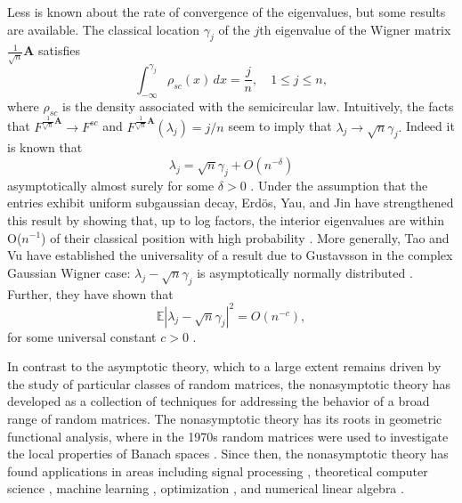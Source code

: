 \documentclass[11pt,letterpaper,twoside,reqno,nosumlimits]{amsart}
\newcommand{\mat}[1]{\ensuremath{\bm{#1}}} %
\newcommand{\E}{\ensuremath{\mathbb{E}}}
\theoremstyle{remark}
\numberwithin{equation}{section}
\numberwithin{thm}{section}
\numberwithin{prop}{section}
\numberwithin{defn}{section}
\numberwithin{remark}{section}
\begin{document}
Less is known about the rate of convergence of the eigenvalues, but some results are available. The classical location $\gamma_j$ of the $j$th eigenvalue of the Wigner matrix $\frac{1}{\sqrt{n}} \mat{A}$ satisfies
\[
\int_{-\infty}^{\gamma_j} \rho_{sc}(x) \, dx = \frac{j}{n}, \quad 1 \leq j \leq n ,
\]
where $\rho_{sc}$ is the density associated with the semicircular law. Intuitively, the facts that $F^{\frac{1}{\sqrt{n}}\mat{A}} \rightarrow F^{sc}$ and $F^{\frac{1}{\sqrt{n}}\mat{A}}(\lambda_j) = j/n$ seem to imply that $\lambda_j \rightarrow \sqrt{n}\gamma_j.$ Indeed it is known that 
\[
\lambda_j = \sqrt{n} \gamma_j + O(n^{-\delta})
\]
asymptotically almost surely for some $\delta > 0$ \cite{BY88a,BY88b}. Under the assumption that the entries exhibit uniform subgaussian decay, Erd\"os, Yau, and Jin have strengthened this result by showing that, up to log factors, the interior eigenvalues are within O($n^{-1}$) of their classical position with high probability \cite{ErdosYauYin10}. More generally, Tao and Vu have established the universality of a result due to Gustavsson \cite{Gustavsson05} in the complex Gaussian Wigner case: $\lambda_j - \sqrt{n} \gamma_j$ is asymptotically normally distributed \cite{TaoVu11}. Further, they have shown that
\[
\E |\lambda_j - \sqrt{n} \gamma_j|^2 = O(n^{-c}),
\]
for some universal constant $c >0$ \cite{TaoVu10}.

In contrast to the asymptotic theory, which to a large extent remains driven by the study of particular classes of random matrices, the nonasymptotic theory has developed as a collection of techniques for addressing the behavior of a broad range of random matrices. The nonasymptotic theory has its roots in geometric functional analysis, where in the 1970s random matrices were used to investigate the local properties of Banach spaces \cite{VershyninRMTnotes, DavidsonSzarek01, LindenstraussMilman93}. Since then, the nonasymptotic theory has found applications in areas including signal processing \cite{RVreconstruction08}, theoretical computer science \cite{SpielmanSrivastava08,Achlioptas03}, machine learning \cite{SW01,KLL10}, optimization \cite{dAsp07,Recht09}, and numerical linear algebra \cite{DM10,Mahoney11}. 
\end{document}

